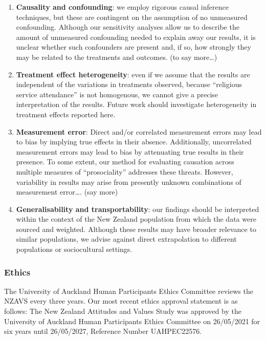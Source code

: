 \documentclass[
  singlecolumn]{article}
\begin{document}
\begin{enumerate}
\def\labelenumi{\arabic{enumi}.}
\item
  \textbf{Causality and confounding}: we employ rigorous causal
  inference techniques, but these are contingent on the assumption of no
  unmeasured confounding. Although our sensitivity analyses allow us to
  describe the amount of unmeasured confounding needed to explain away
  our results, it is unclear whether such confounders are present and,
  if so, how strongly they may be related to the treatments and
  outcomes. (to say more\ldots)
\item
  \textbf{Treatment effect heterogeneity}: even if we assume that the
  results are independent of the variations in treatments observed,
  because ``religious service attendance'' is not homogenous, we cannot
  give a precise interpretation of the results. Future work should
  investigate heterogeneity in treatment effects reported here.
\item
  \textbf{Measurement error}: Direct and/or correlated measurement
  errors may lead to bias by implying true effects in their absence.
  Additionally, uncorrelated measurement errors may lead to bias by
  attenuating true results in their presence. To some extent, our method
  for evaluating causation across multiple measures of ``prosociality''
  addresses these threats. However, variability in results may arise
  from presently unknown combinations of measurement error\ldots. (say
  more)
\item
  \textbf{Generalisability and transportability}: our findings should be
  interpreted within the context of the New Zealand population from
  which the data were sourced and weighted. Although these results may
  have broader relevance to similar populations, we advise against
  direct extrapolation to different populations or sociocultural
  settings.
\end{enumerate}

\newpage{}

\subsubsection{Ethics}\label{ethics}

The University of Auckland Human Participants Ethics Committee reviews
the NZAVS every three years. Our most recent ethics approval statement
is as follows: The New Zealand Attitudes and Values Study was approved
by the University of Auckland Human Participants Ethics Committee on
26/05/2021 for six years until 26/05/2027, Reference Number UAHPEC22576.
\end{document}
